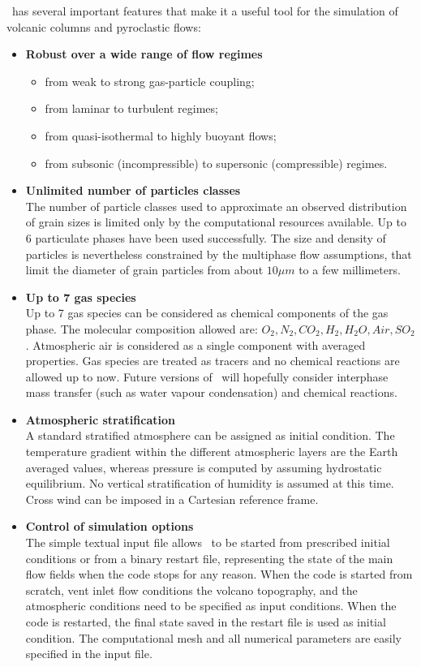 \prettypar
\PDAC\ has several important features that make it a useful tool for the
simulation of volcanic columns and pyroclastic flows: 

\begin{itemize}

\item{\bf Robust over a wide range of flow regimes}
\begin{itemize}
\item from weak to strong gas-particle coupling;
\item from laminar to turbulent regimes;
\item from quasi-isothermal to highly buoyant flows;
\item from subsonic (incompressible) to supersonic (compressible) regimes.
\end{itemize}

\item{\bf Unlimited number of particles classes}\\
The number of particle classes used to approximate an observed distribution
of grain sizes is limited only by the computational resources available.
Up to 6 particulate phases have been used successfully. The size and density
of particles is nevertheless constrained by the multiphase flow assumptions,
that limit the diameter of grain particles from about $10 \mu m$ to a few
millimeters.

\item{\bf Up to 7 gas species}\\
Up to 7 gas species can be considered as chemical components of the gas phase. The 
molecular composition allowed are: $O_2,N_2,CO_2,H_2,H_2O,Air,SO_2$.
Atmospheric air is considered as a single component with averaged properties.
Gas species are treated as tracers and no chemical reactions are allowed up to
now. Future versions of \PDAC\ will hopefully consider interphase mass transfer
(such as water vapour condensation) and chemical reactions.

\item{\bf Atmospheric stratification}\\
A standard stratified atmosphere can be assigned as initial condition.
The temperature gradient within the different atmospheric layers are
the Earth averaged values, whereas pressure is computed by assuming hydrostatic
equilibrium. No vertical stratification of humidity is assumed at this time. 
Cross wind can be imposed in a Cartesian reference frame.

\item{\bf Control of simulation options}\\
The simple textual input file allows \PDAC\ to be started from prescribed
initial conditions or from a binary restart file, representing the state
of the main flow fields when the code stops for any reason. When the code
is started from scratch, vent inlet flow conditions the volcano topography, 
and the atmospheric conditions need to be  specified as input conditions. 
When the code is restarted, the final state saved in the restart file is used 
as initial condition. The computational mesh and all numerical parameters 
are easily specified in the input file.


\end{itemize}
